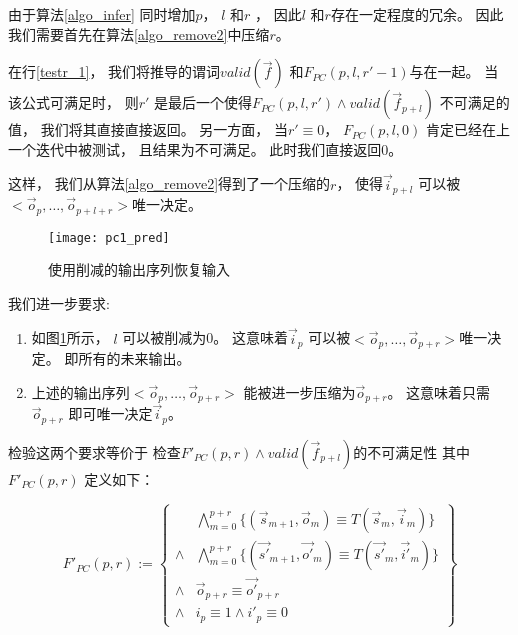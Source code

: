 由于算法\ref{algo_infer} 同时增加$p$， $l$ 和$r$ ，
因此$l$ 和$r$存在一定程度的冗余。
因此我们需要首先在算法\ref{algo_remove2}中压缩$r$。


在行\ref{testr_1}，
我们将推导的谓词$valid(\vec{f})$ 和$F_{PC}(p,l,r'-1)$与在一起。
当该公式可满足时，
则$r'$ 是最后一个使得$F_{PC}(p,l,r')\wedge valid(\vec{f}_{p+l})$ 不可满足的值，
我们将其直接直接返回。
另一方面，
当$r'\equiv 0$，
$F_{PC}(p,l,0)$ 肯定已经在上一个迭代中被测试，
且结果为不可满足。
此时我们直接返回$0$。


这样，
我们从算法\ref{algo_remove2}得到了一个压缩的$r$，
使得$\vec{i}_{p+l}$ 可以被$<\vec{o}_{p},\dots,\vec{o}_{p+l+r}>$唯一决定。

\begin{figure}[b]
\begin{center}
\texttt{[image: pc1\_pred]}
\end{center}
\caption{使用削减的输出序列恢复输入}
  \label{fig_pc1}
\end{figure}

我们进一步要求:
\begin{enumerate}
 \item 如图\ref{fig_pc1}所示，
 $l$ 可以被削减为0。
 这意味着$\vec{i}_{p}$ 可以被$<\vec{o}_{p},\dots,\vec{o}_{p+r}>$唯一决定。
 即所有的未来输出。
 \item 上述的输出序列$<\vec{o}_{p},\dots,\vec{o}_{p+r}>$
 能被进一步压缩为$\vec{o}_{p+r}$。
 这意味着只需$\vec{o}_{p+r}$ 即可唯一决定$\vec{i}_p$。
\end{enumerate}

检验这两个要求等价于
检查$F'_{PC}(p,r)\wedge valid(\vec{f}_{p+l})$的不可满足性
其中$F'_{PC}(p,r)$ 定义如下：

\begin{equation}\label{uniqt11}
F'_{PC}(p,r):=
\left\{
\begin{array}{cc}
&\bigwedge_{m=0}^{p+r}
\{
(\vec{s}_{m+1},\vec{o}_m)\equiv T(\vec{s}_m,\vec{i}_m)
\}
\\
\wedge&\bigwedge_{m=0}^{p+r}
\{
(\vec{s'}_{m+1},\vec{o'}_m)\equiv T(\vec{s'}_m,\vec{i'}_m)
\}
\\
\wedge&\vec{o}_{p+r}\equiv \vec{o'}_{p+r} \\
\wedge& i_{p}\equiv 1 \wedge  i'_{p}\equiv 0
\end{array}
\right\}
\end{equation}


